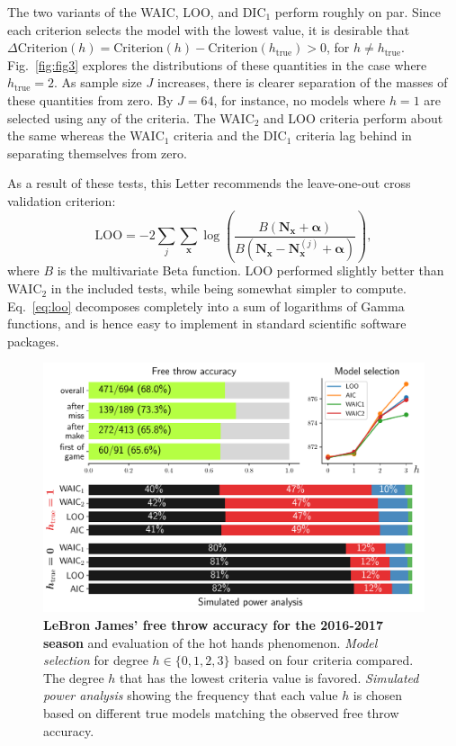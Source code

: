 \documentclass[prl,twocolumn,groupedaddress]{revtex4-1}
\newcommand{\bN}{\mathbf{N}}
\newcommand{\bx}{\mathbf{x}}
\newcommand{\balpha}{{\boldsymbol\alpha}}
\begin{document}
The two variants of the WAIC, LOO, and DIC$_1$ perform roughly on par. Since each criterion selects the model with the lowest value, it is desirable that $\Delta\textrm{Criterion}(h)=\textrm{Criterion}(h)-\textrm{Criterion}(h_{\textrm{true}})>0$, for $h\neq h_{\textrm{true}}$. Fig.~\ref{fig:fig3} explores the distributions of these quantities in the case where $h_{\textrm{true}}=2$.  As sample size $J$ increases, there is clearer separation of the masses of these quantities from zero. By $J=64$, for instance, no models where $h=1$ are selected using any of the criteria. The WAIC$_2$ and LOO criteria perform about the same whereas the WAIC$_1$ criteria and the DIC$_1$ criteria lag behind in separating themselves from zero.


As a result of these tests, this Letter recommends the leave-one-out cross validation criterion:
\begin{equation}
\textrm{LOO} = -2\sum_j \sum_{\bx}  \log\left(  \frac{B(\bN_\bx  +\balpha)}{B(\bN_\bx -\bN_{\bx}^{(j)} +\balpha)} \right),
\label{eq:loo}
\end{equation}
where $B$ is the multivariate Beta function. LOO performed slightly better than WAIC$_2$ in the included tests, while being somewhat simpler to compute. Eq.~\ref{eq:loo} decomposes completely into a sum of logarithms of Gamma functions, and is hence easy to implement in standard scientific software packages.

\begin{figure}
\includegraphics[width=\linewidth]{fig4}
\caption{\textbf{LeBron James' free throw accuracy for the 2016-2017 season} and evaluation of the hot hands phenomenon. \emph{Model selection} for degree $h\in\{0,1,2,3\}$ based on four criteria compared. The degree $h$ that has the lowest criteria value is favored. \emph{Simulated power analysis} showing the frequency that each value $h$ is chosen based on different true models matching the observed free throw accuracy. }
\label{fig:freethrows}
\end{figure}
\end{document}
